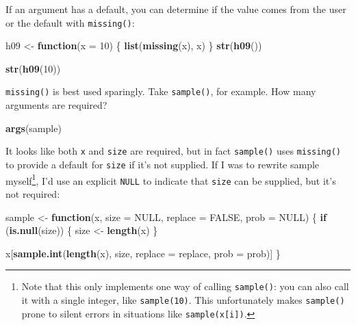 \documentclass[]{book}
\newenvironment{Shaded}{\begin{snugshade}}{\end{snugshade}}
\newcommand{\ControlFlowTok}[1]{\textcolor[rgb]{0.13,0.29,0.53}{\textbf{#1}}}
\newcommand{\DataTypeTok}[1]{\textcolor[rgb]{0.13,0.29,0.53}{#1}}
\newcommand{\DecValTok}[1]{\textcolor[rgb]{0.00,0.00,0.81}{#1}}
\newcommand{\KeywordTok}[1]{\textcolor[rgb]{0.13,0.29,0.53}{\textbf{#1}}}
\newcommand{\NormalTok}[1]{#1}
\newcommand{\OtherTok}[1]{\textcolor[rgb]{0.56,0.35,0.01}{#1}}
\newcommand{\StringTok}[1]{\textcolor[rgb]{0.31,0.60,0.02}{#1}}
\let\rmarkdownfootnote\footnote%
\def\footnote{\protect\rmarkdownfootnote}
\theoremstyle{definition}
\theoremstyle{definition}
\theoremstyle{definition}
\theoremstyle{remark}
\begin{document}
If an argument has a default, you can determine if the value comes from
the user or the default with \texttt{missing()}:

\begin{Shaded}
\begin{Highlighting}[]
\NormalTok{h09 <-}\StringTok{ }\ControlFlowTok{function}\NormalTok{(}\DataTypeTok{x =} \DecValTok{10}\NormalTok{) \{}
  \KeywordTok{list}\NormalTok{(}\KeywordTok{missing}\NormalTok{(x), x)}
\NormalTok{\}}
\KeywordTok{str}\NormalTok{(}\KeywordTok{h09}\NormalTok{())}
\end{Highlighting}
\end{Shaded}

\begin{Shaded}
\begin{Highlighting}[]
\KeywordTok{str}\NormalTok{(}\KeywordTok{h09}\NormalTok{(}\DecValTok{10}\NormalTok{))}
\end{Highlighting}
\end{Shaded}

\texttt{missing()} is best used sparingly. Take \texttt{sample()}, for
example. How many arguments are required?

\begin{Shaded}
\begin{Highlighting}[]
\KeywordTok{args}\NormalTok{(sample)}
\end{Highlighting}
\end{Shaded}

It looks like both \texttt{x} and \texttt{size} are required, but in
fact \texttt{sample()} uses \texttt{missing()} to provide a default for
\texttt{size} if it's not supplied. If I was to rewrite sample
myself\footnote{Note that this only implements one way of calling
  \texttt{sample()}: you can also call it with a single integer, like
  \texttt{sample(10)}. This unfortunately makes \texttt{sample()} prone
  to silent errors in situations like \texttt{sample(x{[}i{]})}.}, I'd
use an explicit \texttt{NULL} to indicate that \texttt{size} can be
supplied, but it's not required:

\begin{Shaded}
\begin{Highlighting}[]
\NormalTok{sample <-}\StringTok{ }\ControlFlowTok{function}\NormalTok{(x, }\DataTypeTok{size =} \OtherTok{NULL}\NormalTok{, }\DataTypeTok{replace =} \OtherTok{FALSE}\NormalTok{, }\DataTypeTok{prob =} \OtherTok{NULL}\NormalTok{) \{}
  \ControlFlowTok{if}\NormalTok{ (}\KeywordTok{is.null}\NormalTok{(size)) \{}
\NormalTok{    size <-}\StringTok{ }\KeywordTok{length}\NormalTok{(x)}
\NormalTok{  \}}
  
\NormalTok{  x[}\KeywordTok{sample.int}\NormalTok{(}\KeywordTok{length}\NormalTok{(x), size, }\DataTypeTok{replace =}\NormalTok{ replace, }\DataTypeTok{prob =}\NormalTok{ prob)]}
\NormalTok{\}}
\end{Highlighting}
\end{Shaded}
\end{document}
